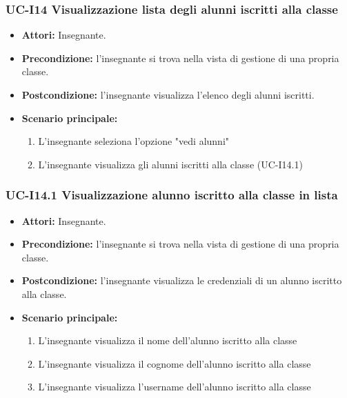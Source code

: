 \subsubsection{UC-I14 Visualizzazione lista degli alunni iscritti alla classe}		
\begin{itemize}
	\item \textbf{Attori:} Insegnante.
	\item \textbf{Precondizione:} l'insegnante si trova nella vista di gestione di una propria classe.
	\item \textbf{Postcondizione:} l'insegnante visualizza l'elenco degli alunni iscritti.
	\item \textbf{Scenario principale:}
	\begin{enumerate}
		\item L'insegnante seleziona l'opzione "vedi alunni"
		\item L'insegnante visualizza gli alunni iscritti alla classe (UC-I14.1)
			\end{enumerate}		
\end{itemize}

\subsubsection{UC-I14.1 Visualizzazione alunno iscritto alla classe in lista}		
\begin{itemize}
	\item \textbf{Attori:} Insegnante.
	\item \textbf{Precondizione:} l'insegnante si trova nella vista di gestione di una propria classe.
	\item \textbf{Postcondizione:} l'insegnante visualizza le credenziali di un alunno iscritto alla classe.
	\item \textbf{Scenario principale:}
	\begin{enumerate}
		\item L'insegnante visualizza il nome dell'alunno iscritto alla classe
		\item L'insegnante visualizza il cognome dell'alunno iscritto alla classe
		\item L'insegnante visualizza l'username dell'alunno iscritto alla classe
			\end{enumerate}		
\end{itemize}

